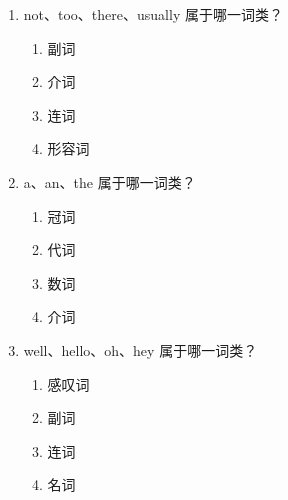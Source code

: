 \documentclass[11pt,a4paper]{ctexart}
\begin{document}
\begin{enumerate}[leftmargin=*,itemsep=4pt]
\item not、too、there、usually 属于哪一词类？
\begin{enumerate}[label=\Alph*.,leftmargin=2em,itemsep=1pt,topsep=2pt]
\item 副词
\item 介词
\item 连词
\item 形容词
\end{enumerate}
\item a、an、the 属于哪一词类？
\begin{enumerate}[label=\Alph*.,leftmargin=2em,itemsep=1pt,topsep=2pt]
\item 冠词
\item 代词
\item 数词
\item 介词
\end{enumerate}
\item well、hello、oh、hey 属于哪一词类？
\begin{enumerate}[label=\Alph*.,leftmargin=2em,itemsep=1pt,topsep=2pt]
\item 感叹词
\item 副词
\item 连词
\item 名词
\end{enumerate}
\end{enumerate}
\end{document}
